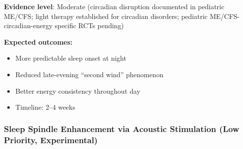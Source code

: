 \begin{recommendation}
\textbf{Evidence level}: Moderate (circadian disruption documented in pediatric ME/CFS; light therapy established for circadian disorders; pediatric ME/CFS-circadian-energy specific RCTs pending)

\textbf{Expected outcomes:}
\begin{itemize}
    \item More predictable sleep onset at night
    \item Reduced late-evening ``second wind'' phenomenon
    \item Better energy consistency throughout day
    \item Timeline: 2--4 weeks
\end{itemize}

\end{recommendation}

\subsubsection{Sleep Spindle Enhancement via Acoustic Stimulation (Low Priority, Experimental)}

